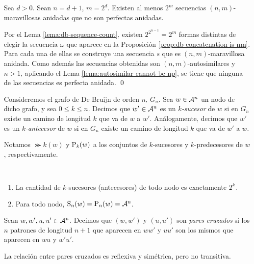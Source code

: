 \begin{teo}
  Sea $d > 0$. Sean $n = d + 1$, $m = 2^d$. Existen al menos $2^m$
  secuencias $(n, m)$-maravillosas anidadas que no son perfectas anidadas.
\end{teo}

\begin{demo}
  Por el Lema \ref{lema:db-sequence-count}, existen $2^{2^{n-1}} = 2^m$ formas
  distintas de elegir la secuencia $\omega$ que aparece en la Proposición
  \ref{prop:db-concatenation-is-nm}. Para cada una de ellas se construye una
  secuencia $s$ que es $(n, m)$-maravillosa anidada. Como además las
  secuencias obtenidas son $(n,m)$-autosimilares y $n > 1$, aplicando el Lema
  \ref{lema:autosimilar-cannot-be-np}, se tiene que ninguna de las secuencias
  es perfecta anidada. \qed
\end{demo}

\begin{defi}
  Consideremos el grafo de De Bruijn de orden $n$, $G_n$. Sea $w \in
    \mathcal{A}^n$ un nodo de dicho grafo, y sea $0 \leq k \leq n$.
  Decimos que $w' \in \mathcal{A}^n$ es un \emph{$k$-sucesor} de $w$ si en $G_n$
  existe un camino de longitud $k$ que va de $w$ a $w'$.
  Análogamente, decimos que $w'$ es un \emph{$k$-antecesor} de $w$ si en $G_n$
  existe un camino de longitud $k$ que va de $w'$ a $w$.

  Notamos $\Succ{k}(w)$ y $\text{P}_{k}(w)$ a los conjuntos de $k$-sucesores y
  $k$-predecesores de $w$, respectivamente.
\end{defi}

\begin{obs}\ %
  \begin{enumerate}
    \item La cantidad de $k$-sucesores (antecesores) de todo nodo es
          exactamente $2^k$.
    \item Para todo nodo, $\text{S}_{n}(w) = \text{P}_{n}(w) = \mathcal{A}^n$.
  \end{enumerate}
\end{obs}

\begin{defi}
  Sean $w,w',u,u' \in \mathcal{A}^n$. Decimos que $(w,w')$ y $(u,u')$ son
  \emph{pares cruzados} si los $n$ patrones de longitud $n + 1$ que aparecen en
  $ww'$ y $uu'$ son los mismos que aparecen en $wu$ y $w'u'$.
\end{defi}

\begin{obs}
  La relación entre pares cruzados es reflexiva y simétrica, pero no
  transitiva.
\end{obs}

